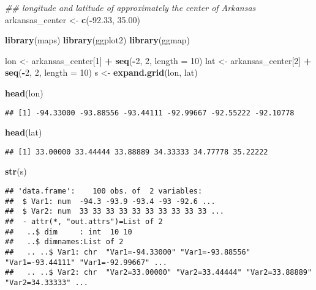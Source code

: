 \documentclass[]{book}
\newenvironment{Shaded}{\begin{snugshade}}{\end{snugshade}}
\newcommand{\CommentTok}[1]{\textcolor[rgb]{0.56,0.35,0.01}{\textit{#1}}}
\newcommand{\DataTypeTok}[1]{\textcolor[rgb]{0.13,0.29,0.53}{#1}}
\newcommand{\DecValTok}[1]{\textcolor[rgb]{0.00,0.00,0.81}{#1}}
\newcommand{\FloatTok}[1]{\textcolor[rgb]{0.00,0.00,0.81}{#1}}
\newcommand{\KeywordTok}[1]{\textcolor[rgb]{0.13,0.29,0.53}{\textbf{#1}}}
\newcommand{\NormalTok}[1]{#1}
\newcommand{\OperatorTok}[1]{\textcolor[rgb]{0.81,0.36,0.00}{\textbf{#1}}}
\newcommand{\StringTok}[1]{\textcolor[rgb]{0.31,0.60,0.02}{#1}}
\begin{document}
\begin{Shaded}
\begin{Highlighting}[]
\CommentTok{## longitude and latitude of approximately the center of Arkansas}
\NormalTok{arkansas_center <-}\StringTok{ }\KeywordTok{c}\NormalTok{(}\OperatorTok{-}\FloatTok{92.33}\NormalTok{, }\FloatTok{35.00}\NormalTok{) }

\KeywordTok{library}\NormalTok{(maps)}
\KeywordTok{library}\NormalTok{(ggplot2)}
\KeywordTok{library}\NormalTok{(ggmap)}

\NormalTok{lon <-}\StringTok{ }\NormalTok{arkansas_center[}\DecValTok{1}\NormalTok{] }\OperatorTok{+}\StringTok{ }\KeywordTok{seq}\NormalTok{(}\OperatorTok{-}\DecValTok{2}\NormalTok{, }\DecValTok{2}\NormalTok{, }\DataTypeTok{length =} \DecValTok{10}\NormalTok{)   }
\NormalTok{lat <-}\StringTok{ }\NormalTok{arkansas_center[}\DecValTok{2}\NormalTok{] }\OperatorTok{+}\StringTok{ }\KeywordTok{seq}\NormalTok{(}\OperatorTok{-}\DecValTok{2}\NormalTok{, }\DecValTok{2}\NormalTok{, }\DataTypeTok{length =} \DecValTok{10}\NormalTok{)   }
\NormalTok{s   <-}\StringTok{ }\KeywordTok{expand.grid}\NormalTok{(lon, lat)}

\KeywordTok{head}\NormalTok{(lon)}
\end{Highlighting}
\end{Shaded}

\begin{verbatim}
## [1] -94.33000 -93.88556 -93.44111 -92.99667 -92.55222 -92.10778
\end{verbatim}

\begin{Shaded}
\begin{Highlighting}[]
\KeywordTok{head}\NormalTok{(lat) }
\end{Highlighting}
\end{Shaded}

\begin{verbatim}
## [1] 33.00000 33.44444 33.88889 34.33333 34.77778 35.22222
\end{verbatim}

\begin{Shaded}
\begin{Highlighting}[]
\KeywordTok{str}\NormalTok{(s)}
\end{Highlighting}
\end{Shaded}

\begin{verbatim}
## 'data.frame':    100 obs. of  2 variables:
##  $ Var1: num  -94.3 -93.9 -93.4 -93 -92.6 ...
##  $ Var2: num  33 33 33 33 33 33 33 33 33 33 ...
##  - attr(*, "out.attrs")=List of 2
##   ..$ dim     : int  10 10
##   ..$ dimnames:List of 2
##   .. ..$ Var1: chr  "Var1=-94.33000" "Var1=-93.88556" "Var1=-93.44111" "Var1=-92.99667" ...
##   .. ..$ Var2: chr  "Var2=33.00000" "Var2=33.44444" "Var2=33.88889" "Var2=34.33333" ...
\end{verbatim}
\end{document}
